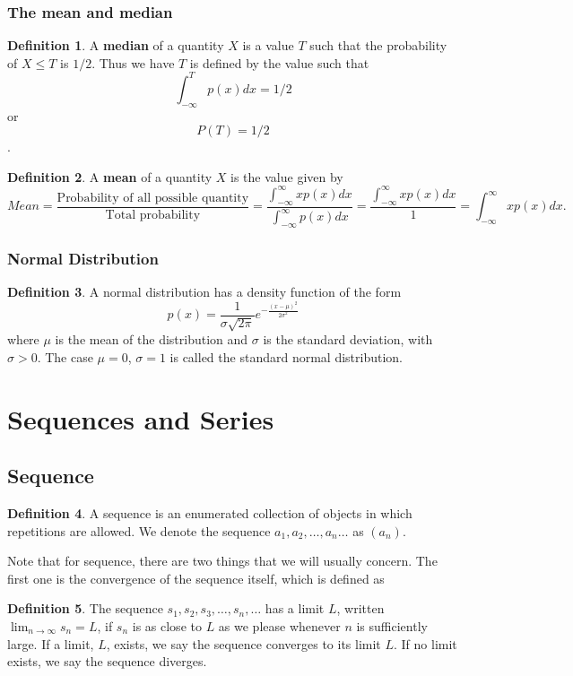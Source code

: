 \documentclass[12pt]{article}
\theoremstyle{definition}
\theoremstyle{definition}
\newtheorem{definition}{Definition}[section]
\theoremstyle{remark}
\theoremstyle{definition}
\theoremstyle{definition}
\theoremstyle{definition}
\begin{document}
\subsubsection*{The mean and median}
\begin{definition}
A \textbf{median} of a quantity $X$ is a value $T$ such that the probability of $X\leq T$ is $1/2$. Thus we have  $T$ is defined by the value such that
\[ \int_{-\infty}^T p(x) dx=1/2 \] or \[P(T)=1/2\].
\end{definition}
\begin{definition} A \textbf{mean} of a quantity $X$ is the value given by
	\[ Mean= \frac{\text{Probability of all possible quantity}}{\text{Total probability}}= \frac{\int_{-\infty}^{\infty}xp(x)dx}{\int_{-\infty}^{\infty}p(x)dx}=\frac{\int_{-\infty}^{\infty}xp(x)dx}{1}=\int_{-\infty}^{\infty}xp(x)dx. \]
\end{definition}

\subsubsection*{Normal Distribution}
\begin{definition}
A normal distribution has a density function of the form 
\[p(x)=\frac{1}{\sigma \sqrt{2 \pi}}e^{-\frac{(x-\mu)^2}{2\sigma^2}}\] where $\mu$ is the mean of the distribution and $\sigma$ is the standard deviation, with $\sigma > 0$.
The case $\mu = 0$, $\sigma = 1$ is called the standard normal distribution.

\end{definition}

\section{Sequences and Series}
\subsection{Sequence}
\begin{definition}
	A sequence is an enumerated collection of objects in which repetitions are allowed. We denote the sequence $a_1, a_2, \ldots, a_n \ldots $ as $(a_n)$.

\end{definition}	

Note that for sequence, there are two things that we will usually concern. The first one is the convergence of the sequence itself, which is defined as 

\begin{definition}
The sequence $s_1, s_2, s_3, \ldots , s_n, \ldots$ has a limit $L$, written $\lim_{n \to \infty}s_n = L$, if $s_n$ is as close to
$L$ as we please whenever $n$ is sufficiently large. If a limit, $L$, exists, we say the sequence
converges to its limit $L$. If no limit exists, we say the sequence diverges.
\end{definition}
\end{document}
